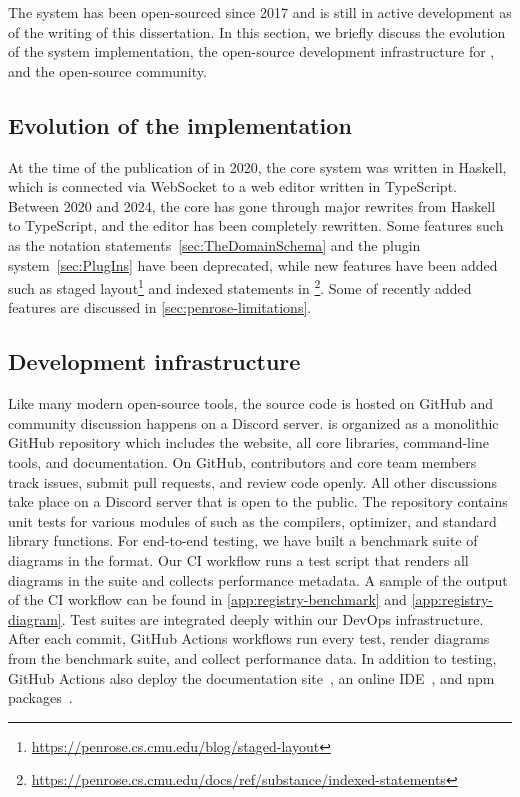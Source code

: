 The \Penrose{} system has been open-sourced since 2017 and is still in active development as of the writing of this dissertation. In this section, we briefly discuss the evolution of the system implementation, the open-source development infrastructure for \Penrose, and the open-source community. 

\subsection{Evolution of the implementation}
\label{sec:development-history}

At the time of the publication of \cite{penrose} in 2020, the core system was written in Haskell, which is connected via WebSocket to a web editor written in TypeScript. Between 2020 and 2024, the core has gone through major rewrites from Haskell to TypeScript, and the editor has been completely rewritten. Some features such as the notation statements~\cref{sec:TheDomainSchema} and the plugin system~\cref{sec:PlugIns} have been deprecated, while new features have been added such as staged layout\footnote{\url{https://penrose.cs.cmu.edu/blog/staged-layout}} and indexed statements in \Substance{}\footnote{\url{https://penrose.cs.cmu.edu/docs/ref/substance/indexed-statements}}. Some of recently added features are discussed in \cref{sec:penrose-limitations}.

\subsection{Development infrastructure} 

Like many modern open-source tools, the \Penrose source code is hosted on GitHub and community discussion happens on a Discord server. \Penrose is organized as a monolithic GitHub repository which includes the website, all core libraries, command-line tools, and documentation. On GitHub, contributors and core team members track issues, submit pull requests, and review code openly. All other discussions take place on a Discord server that is open to the public. The repository contains unit tests for various modules of \Penrose such as the compilers, optimizer, and standard library functions. For end-to-end testing, we have built a benchmark suite of diagrams in the \Penrose format. Our CI workflow runs a test script that renders all diagrams in the suite and collects performance metadata. A sample of the output of the CI workflow can be found in \cref{app:registry-benchmark} and \cref{app:registry-diagram}. Test suites are integrated deeply within our DevOps infrastructure. After each commit, GitHub Actions workflows run every test, render diagrams from the benchmark suite, and collect performance data. In addition to testing, GitHub Actions also deploy the \Penrose documentation site~\cite{penrose-docs}, an online IDE~\cite{penrose-ide}, and npm packages~\cite{penrose-npm}. 

